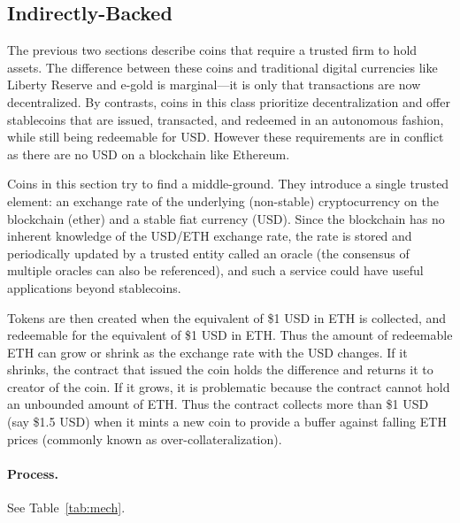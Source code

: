 \subsection{Indirectly-Backed}
\label{sec:dai}

The previous two sections describe coins that require a trusted firm to hold assets. The difference between these coins and traditional digital currencies like Liberty Reserve and e-gold is marginal---it is only that transactions are now decentralized. By contrasts, coins in this class prioritize decentralization and offer stablecoins that are issued, transacted, and redeemed in an autonomous fashion, while still being redeemable for USD. However these requirements are in conflict as there are no USD on a blockchain like Ethereum.

Coins in this section try to find a middle-ground. They introduce a single trusted element: an exchange rate of the underlying (non-stable) cryptocurrency on the blockchain (\eg ether) and a stable fiat currency (\eg USD). Since the blockchain has no inherent knowledge of the USD/ETH exchange rate, the rate is stored and periodically updated by a trusted entity called an oracle (the consensus of multiple oracles can also be referenced), and such a service could have useful applications beyond stablecoins.

Tokens are then created when the equivalent of \$1 USD in ETH is collected, and redeemable for the equivalent of \$1 USD in ETH. Thus the amount of redeemable ETH can grow or shrink as the exchange rate with the USD changes. If it shrinks, the contract that issued the coin holds the difference and returns it to creator of the coin. If it grows, it is problematic because the contract cannot hold an unbounded amount of ETH. Thus the contract collects more than \$1 USD (say \$1.5 USD) when it mints a new coin to provide a buffer against falling ETH prices (commonly known as over-collateralization).

\paragraph{Process.} See Table~\ref{tab:mech}.

